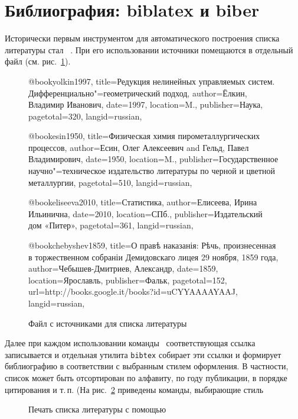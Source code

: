 \documentclass[a4paper,12pt,hyphens]{article}
\newcommand\package[1]{\texttt{#1}}
\newcommand\lcmd[1]{\texttt{#1}}
\DeclareRobustCommand{\myBibTeX}{\BibTeX}
\begin{document}
\section{Библиография: biblatex и biber}\label{sec:Bibliography}
Исторически первым инструментом для автоматического построения
списка литературы стал \BibTeX\ \parencite{ctan-bibtex}. При его
использовании источники
помещаются в отдельный файл (см. рис.~\ref{bibfile}).
\begin{figure}[tp]
\begin{bibtexcode}
@book{yolkin1997,
  title={Редукция нелинейных управляемых систем.
         Дифференциально"=геометрический подход},
  author={Ёлкин, Владимир Иванович},
  date={1997},
  location={M.},
  publisher={Наука},
  pagetotal={320},
  langid={russian},
}

@book{esin1950,
  title={Физическая химия пирометаллургических процессов},
  author={Есин, Олег Алексеевич and Гельд, Павел Владимирович},
  date={1950},
  location={M.},
  publisher={Государственное научно"=техническое издательство
             литературы по черной и цветной металлургии},
  pagetotal={510},
  langid={russian},
}

@book{eliseeva2010,
  title={Статистика},
  author={Елисеева, Ирина Ильинична},
  date={2010},
  location={СПб.},
  publisher={Издательский дом «Питер»},
  pagetotal={361},
  langid={russian},
}

@book{chebyshev1859,
  title={О правѣ наказанія: Рѣчь, произнесенная в торжественном
         собраніи Демидовскаго лицея 29 ноября, 1859 года},
  author={Чебышев-Дмитриев, Александр},
  date={1859},
  location={Ярославль},
  publisher={Фальк},
  pagetotal={152},
  url={http://books.google.it/books?id=uCYYAAAAYAAJ},
  langid={russian},
}
\end{bibtexcode}
\caption{Файл с источниками для списка литературы}\label{bibfile}
\end{figure}
Далее при каждом использовании команды~\lcmd{\cite{key}} соответствующая
ссылка записывается и отдельная утилита \package{bibtex} собирает эти
ссылки и формирует библиографию в соответствии с выбранным стилем оформления.
В частности, список может быть отсортирован по алфавиту, по году
публикации, в порядке цитирования и т.\,п.
(На рис.~\ref{bibliography} приведены команды, выбирающие стиль
\begin{figure}[tp]
\begin{latexcode}


\end{latexcode}
\caption{Печать списка литературы с помощью \myBibTeX}\label{bibliography}
\end{figure}
\end{document}
